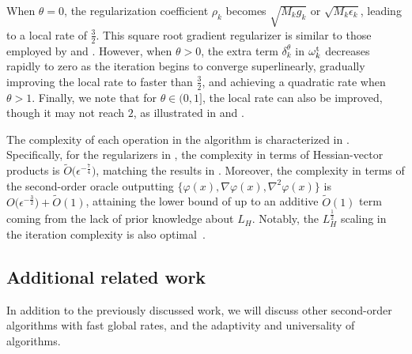 When $\theta = 0$, the regularization coefficient $\rho_k$ becomes $\sqrt{M_kg_k}$ or $\sqrt{M_k\epsilon_k}$, leading to a local rate of $\frac{3}{2}$. 
This square root gradient regularizer is similar to those employed by \citet{gratton2024yet} and \citet{he2023newton}. 
However, when $\theta > 0$, the extra term $\delta_k^\theta$ in $\omega_k^{\mathrm{t}}$ decreases rapidly to zero as the iteration begins to converge superlinearly, 
gradually improving the local rate to faster than $\frac{3}{2}$, and achieving a quadratic rate when $\theta > 1$.
Finally, we note that for $\theta \in (0, 1]$, the local rate can also be improved, though it may not reach $2$, as illustrated in  and .

The complexity of each operation in the algorithm is characterized in .
Specifically, for the regularizers in , 
the complexity in terms of Hessian-vector products is $\tilde O\big( \epsilon^{-\frac{7}{4}} \big)$,
matching the results in \citet{carmon2017convex,royer2020newton}.
Moreover, the complexity in terms of the second-order oracle outputting $
\{ \varphi(x), \nabla \varphi(x), \nabla^2\varphi(x) \}$ is $O\big (\epsilon^{-\frac{3}{2}} \big) + \tilde O(1)$, attaining the lower bound of \citet{carmon2020lower} up to an additive $\tilde O(1)$ term coming from the lack of prior knowledge about $L_H$.
Notably, the $L^{\frac{1}{2}}_H$ scaling in the iteration complexity is also optimal~\citep{carmon2020lower}.





\subsection{Additional related work} \label{sec:newton-cg-additional-related-works}

In addition to the previously discussed work, we will discuss other second-order algorithms with fast global rates, and the adaptivity and universality of algorithms.

